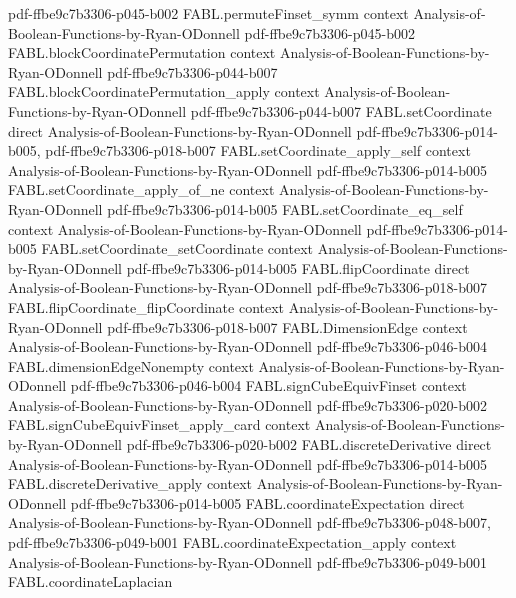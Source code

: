 \begin{theorem}
  {pdf-ffbe9c7b3306-p045-b002}
\proofstep
  {FABL.permuteFinset_symm}
  {context}
  {Analysis-of-Boolean-Functions-by-Ryan-ODonnell}
  {pdf-ffbe9c7b3306-p045-b002}
\proofstep
  {FABL.blockCoordinatePermutation}
  {context}
  {Analysis-of-Boolean-Functions-by-Ryan-ODonnell}
  {pdf-ffbe9c7b3306-p044-b007}
\proofstep
  {FABL.blockCoordinatePermutation_apply}
  {context}
  {Analysis-of-Boolean-Functions-by-Ryan-ODonnell}
  {pdf-ffbe9c7b3306-p044-b007}
\proofstep
  {FABL.setCoordinate}
  {direct}
  {Analysis-of-Boolean-Functions-by-Ryan-ODonnell}
  {pdf-ffbe9c7b3306-p014-b005,
    pdf-ffbe9c7b3306-p018-b007}
\proofstep
  {FABL.setCoordinate_apply_self}
  {context}
  {Analysis-of-Boolean-Functions-by-Ryan-ODonnell}
  {pdf-ffbe9c7b3306-p014-b005}
\proofstep
  {FABL.setCoordinate_apply_of_ne}
  {context}
  {Analysis-of-Boolean-Functions-by-Ryan-ODonnell}
  {pdf-ffbe9c7b3306-p014-b005}
\proofstep
  {FABL.setCoordinate_eq_self}
  {context}
  {Analysis-of-Boolean-Functions-by-Ryan-ODonnell}
  {pdf-ffbe9c7b3306-p014-b005}
\proofstep
  {FABL.setCoordinate_setCoordinate}
  {context}
  {Analysis-of-Boolean-Functions-by-Ryan-ODonnell}
  {pdf-ffbe9c7b3306-p014-b005}
\proofstep
  {FABL.flipCoordinate}
  {direct}
  {Analysis-of-Boolean-Functions-by-Ryan-ODonnell}
  {pdf-ffbe9c7b3306-p018-b007}
\proofstep
  {FABL.flipCoordinate_flipCoordinate}
  {context}
  {Analysis-of-Boolean-Functions-by-Ryan-ODonnell}
  {pdf-ffbe9c7b3306-p018-b007}
\proofstep
  {FABL.DimensionEdge}
  {context}
  {Analysis-of-Boolean-Functions-by-Ryan-ODonnell}
  {pdf-ffbe9c7b3306-p046-b004}
\proofstep
  {FABL.dimensionEdgeNonempty}
  {context}
  {Analysis-of-Boolean-Functions-by-Ryan-ODonnell}
  {pdf-ffbe9c7b3306-p046-b004}
\proofstep
  {FABL.signCubeEquivFinset}
  {context}
  {Analysis-of-Boolean-Functions-by-Ryan-ODonnell}
  {pdf-ffbe9c7b3306-p020-b002}
\proofstep
  {FABL.signCubeEquivFinset_apply_card}
  {context}
  {Analysis-of-Boolean-Functions-by-Ryan-ODonnell}
  {pdf-ffbe9c7b3306-p020-b002}
\proofstep
  {FABL.discreteDerivative}
  {direct}
  {Analysis-of-Boolean-Functions-by-Ryan-ODonnell}
  {pdf-ffbe9c7b3306-p014-b005}
\proofstep
  {FABL.discreteDerivative_apply}
  {context}
  {Analysis-of-Boolean-Functions-by-Ryan-ODonnell}
  {pdf-ffbe9c7b3306-p014-b005}
\proofstep
  {FABL.coordinateExpectation}
  {direct}
  {Analysis-of-Boolean-Functions-by-Ryan-ODonnell}
  {pdf-ffbe9c7b3306-p048-b007,
    pdf-ffbe9c7b3306-p049-b001}
\proofstep
  {FABL.coordinateExpectation_apply}
  {context}
  {Analysis-of-Boolean-Functions-by-Ryan-ODonnell}
  {pdf-ffbe9c7b3306-p049-b001}
\proofstep
  {FABL.coordinateLaplacian}

\end{theorem}
